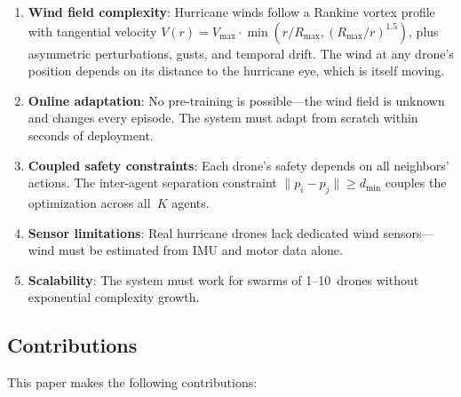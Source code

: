\documentclass[11pt,twocolumn]{article}
\theoremstyle{definition}
\begin{document}
\begin{enumerate}[leftmargin=*]
    \item \textbf{Wind field complexity}: Hurricane winds follow a Rankine vortex profile with tangential velocity $V(r) = V_{\max} \cdot \min(r/R_{\max}, (R_{\max}/r)^{1.5})$, plus asymmetric perturbations, gusts, and temporal drift. The wind at any drone's position depends on its distance to the hurricane eye, which is itself moving.
    
    \item \textbf{Online adaptation}: No pre-training is possible---the wind field is unknown and changes every episode. The system must adapt from scratch within seconds of deployment.
    
    \item \textbf{Coupled safety constraints}: Each drone's safety depends on all neighbors' actions. The inter-agent separation constraint $\|p_i - p_j\| \geq d_{\min}$ couples the optimization across all~$K$ agents.
    
    \item \textbf{Sensor limitations}: Real hurricane drones lack dedicated wind sensors---wind must be estimated from IMU and motor data alone.
    
    \item \textbf{Scalability}: The system must work for swarms of 1--10~drones without exponential complexity growth.
\end{enumerate}

\subsection{Contributions}
\label{sec:contributions}

This paper makes the following contributions:
\end{document}
